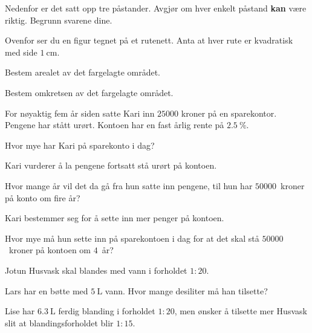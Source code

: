 \begin{oppgaver}
     Nedenfor er det satt opp tre påstander. Avgjør om hver enkelt
    påstand \textbf{kan} være riktig. Begrunn svarene dine.
\end{oppgaver}


\Oppgave[4] %

Ovenfor ser du en figur tegnet på et rutenett. Anta at hver rute er kvadratisk
med side $\SI{1}{\cm}$.

\begin{oppgaver}
     Bestem arealet av det fargelagte området.
\end{oppgaver}

\begin{oppgaver}
     Bestem omkretsen av det fargelagte området.
\end{oppgaver}


\Oppgave[6] %

For nøyaktig fem år siden satte Kari inn $\num{25000}$ kroner på en sparekontor.
Pengene har stått urørt. Kontoen har en fast årlig rente på
$\SI{2.5}{\percent}$.

\begin{oppgaver}
     Hvor mye har Kari på sparekonto i dag?
\end{oppgaver}

Kari vurderer å la pengene fortsatt stå urørt på kontoen.

\begin{oppgaver}
     Hvor mange år vil det da gå fra hun satte inn pengene, til hun har
    $\num{50000}$~kroner på konto om fire år?
\end{oppgaver}

Kari bestemmer seg for å sette inn mer penger på kontoen.

\begin{oppgaver}
     Hvor mye må hun sette inn på sparekontoen i dag for at det skal stå
    $\num{50000}$~kroner på kontoen om $4$~år?
\end{oppgaver}


\Oppgave[3] %

Jotun Husvask skal blandes med vann i forholdet $1:20$.

\begin{oppgaver}
     Lars har en bøtte med $\SI{5}{\L}$ vann. Hvor mange desiliter må
    han tilsette?
\end{oppgaver}

Lise har $\SI{6.3}{\L}$ ferdig blanding i forholdet $1:20$, men ønsker å
tilsette mer Husvask slit at blandingsforholdet blir $1:15$.

